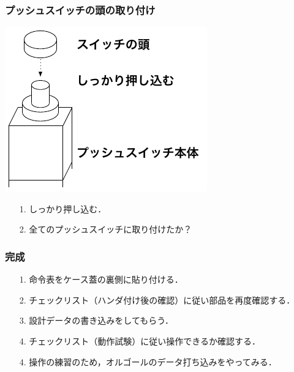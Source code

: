 \documentclass[handout]{beamer}        %
\begin{document}
\begin{frame}
  \frametitle{プッシュスイッチの頭の取り付け}
  \vfill
  \centerline{\includegraphics[scale=0.8]{../Tikz/atama.pdf}}
  \vfill
  \begin{enumerate}
    \item[1.] しっかり押し込む．
    \item[2.] 全てのプッシュスイッチに取り付けたか？
  \end{enumerate}
  \vfill
\end{frame}

\begin{frame}
  \frametitle{完成}
  \begin{enumerate}
    \item[1.] 命令表をケース蓋の裏側に貼り付ける．
    \item[2.] チェックリスト（ハンダ付け後の確認）に従い部品を再度確認する．
    \item[3.] 設計データの書き込みをしてもらう．
    \item[4.] チェックリスト（動作試験）に従い操作できるか確認する．
    \item[4.] 操作の練習のため，オルゴールのデータ打ち込みをやってみる．
  \end{enumerate}
  \vfill
\end{frame}

\end{document}
